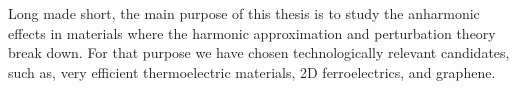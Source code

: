 Long made short, the main purpose of this thesis is to study the anharmonic effects in materials where the harmonic 
approximation and perturbation theory break down. For that purpose we have chosen technologically relevant 
candidates, such as, very efficient thermoelectric materials, 2D ferroelectrics, and graphene.
